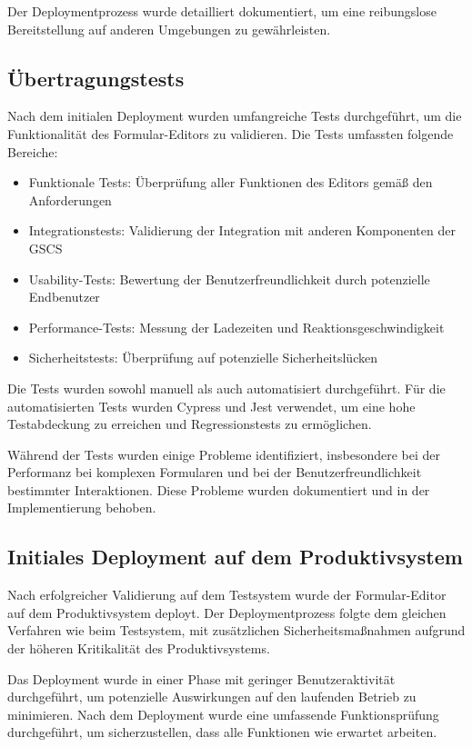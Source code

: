 \documentclass[a4paper,11pt]{article}
\begin{document}
\noindent Der Deploymentprozess wurde detailliert dokumentiert, um eine reibungslose Bereitstellung auf anderen Umgebungen zu gewährleisten.

\subsection{Übertragungstests}
Nach dem initialen Deployment wurden umfangreiche Tests durchgeführt, um die Funktionalität des Formular-Editors zu validieren. Die Tests umfassten folgende Bereiche:

\begin{itemize}
  \item Funktionale Tests: Überprüfung aller Funktionen des Editors gemäß den Anforderungen
  \item Integrationstests: Validierung der Integration mit anderen Komponenten der GSCS
  \item Usability-Tests: Bewertung der Benutzerfreundlichkeit durch potenzielle Endbenutzer
  \item Performance-Tests: Messung der Ladezeiten und Reaktionsgeschwindigkeit
  \item Sicherheitstests: Überprüfung auf potenzielle Sicherheitslücken
\end{itemize}

\noindent Die Tests wurden sowohl manuell als auch automatisiert durchgeführt. Für die automatisierten Tests wurden Cypress und Jest verwendet, um eine hohe Testabdeckung zu erreichen und Regressionstests zu ermöglichen.

\noindent Während der Tests wurden einige Probleme identifiziert, insbesondere bei der Performanz bei komplexen Formularen und bei der Benutzerfreundlichkeit bestimmter Interaktionen. Diese Probleme wurden dokumentiert und in der Implementierung behoben.

\subsection{Initiales Deployment auf dem Produktivsystem}
Nach erfolgreicher Validierung auf dem Testsystem wurde der Formular-Editor auf dem Produktivsystem deployt. Der Deploymentprozess folgte dem gleichen Verfahren wie beim Testsystem, mit zusätzlichen Sicherheitsmaßnahmen aufgrund der höheren Kritikalität des Produktivsystems.

\noindent Das Deployment wurde in einer Phase mit geringer Benutzeraktivität durchgeführt, um potenzielle Auswirkungen auf den laufenden Betrieb zu minimieren. Nach dem Deployment wurde eine umfassende Funktionsprüfung durchgeführt, um sicherzustellen, dass alle Funktionen wie erwartet arbeiten.
\end{document}
